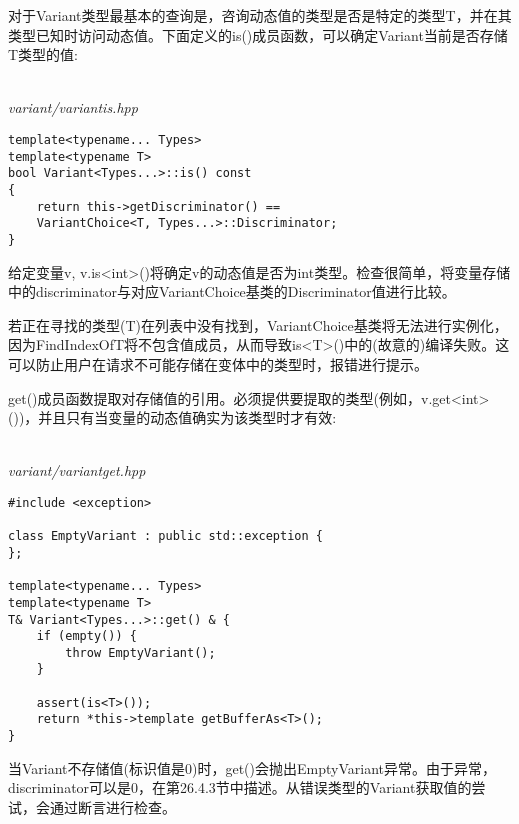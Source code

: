 对于Variant类型最基本的查询是，咨询动态值的类型是否是特定的类型T，并在其类型已知时访问动态值。下面定义的is()成员函数，可以确定Variant当前是否存储T类型的值:

\hspace*{\fill} \\ %
\noindent
\textit{variant/variantis.hpp}
\begin{lstlisting}[style=styleCXX]
template<typename... Types>
template<typename T>
bool Variant<Types...>::is() const
{
	return this->getDiscriminator() ==
	VariantChoice<T, Types...>::Discriminator;
}
\end{lstlisting}

给定变量v, v.is<int>()将确定v的动态值是否为int类型。检查很简单，将变量存储中的discriminator与对应VariantChoice基类的Discriminator值进行比较。

若正在寻找的类型(T)在列表中没有找到，VariantChoice基类将无法进行实例化，因为FindIndexOfT将不包含值成员，从而导致is<T>()中的(故意的)编译失败。这可以防止用户在请求不可能存储在变体中的类型时，报错进行提示。

get()成员函数提取对存储值的引用。必须提供要提取的类型(例如，v.get<int>())，并且只有当变量的动态值确实为该类型时才有效:

\hspace*{\fill} \\ %
\noindent
\textit{variant/variantget.hpp}
\begin{lstlisting}[style=styleCXX]
#include <exception>

class EmptyVariant : public std::exception {
};

template<typename... Types>
template<typename T>
T& Variant<Types...>::get() & {
	if (empty()) {
		throw EmptyVariant();
	}

	assert(is<T>());
	return *this->template getBufferAs<T>();
}
\end{lstlisting}

当Variant不存储值(标识值是0)时，get()会抛出EmptyVariant异常。由于异常，discriminator可以是0，在第26.4.3节中描述。从错误类型的Variant获取值的尝试，会通过断言进行检查。













































